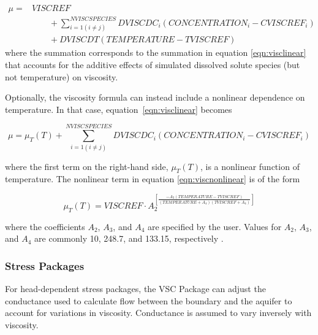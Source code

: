 \begin{equation}
\label{eqn:visclinearT}
\begin{aligned}
\mu =&VISCREF\\ 
         &\qquad+ \sum_{i=1 \left( i \not= j \right)}^{NVISCSPECIES} DVISCDC_i \left ( CONCENTRATION_i - CVISCREF_i \right )\\
         &\qquad+ DVISCDT \left ( TEMPERATURE - TVISCREF \right )
\end{aligned}
\end{equation}
where the summation corresponds to the summation in equation \ref{eqn:visclinear} that accounts for the additive effects of simulated dissolved solute species (but not temperature) on viscosity.

Optionally, the viscosity formula can instead include a nonlinear dependence on temperature. In that case, equation~\ref{eqn:visclinear} becomes

\begin{equation}
\label{eqn:viscnonlinear}
\mu = \mu_T(T) + \sum_{i=1 \left( i \not= j \right)}^{NVISCSPECIES} DVISCDC_i \left ( CONCENTRATION_i - CVISCREF_i \right )
\end{equation}

\noindent where the first term on the right-hand side, $\mu_T(T)$, is a nonlinear function of temperature.  The nonlinear term in equation \ref{eqn:viscnonlinear} is of the form

\begin{equation}
\label{eqn:munonlinear}
\mu_T(T) = VISCREF \cdot A_2^{\left [ \frac {-A_3 \left ( TEMPERATURE - TVISCREF \right ) } {\left ( TEMPERATURE + A_4 \right ) \left ( TVISCREF + A_4 \right )} \right ]}
\end{equation}

\noindent where the coefficients $A_2$, $A_3$, and $A_4$ are specified by the user.  Values for $A_2$, $A_3$, and $A_4$ are commonly 10, 248.7, and 133.15, respectively  \citep{langevin2008seawat, Voss1984sutra}.
 
\subsubsection{Stress Packages}

For head-dependent stress packages, the VSC Package can adjust the conductance used to calculate flow between the boundary and the aquifer to account for variations in viscosity. Conductance is assumed to vary inversely with viscosity.

